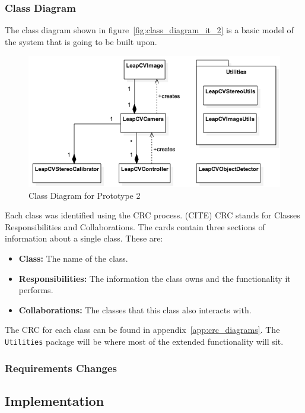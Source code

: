 \documentclass[11pt,oneside]{report}
\newcommand\code[1]{\texttt{#1}}
\begin{document}
		\subsubsection{Class Diagram}
		The class diagram shown in figure~\ref{fig:class_diagram_it_2} is a basic model of the system that is going to be built upon.
		\begin{figure}[ht]
		\begin{center}
    			\includegraphics[scale=0.65]{class_diagram_it_2}
    			\caption{Class Diagram for Prototype 2 \protect {\label{fig:class_diagram_it_2}}}
    		\end{center}
		\end{figure}			
		Each class was identified using the CRC process. (CITE)
		CRC stands for Classes Responsibilities and Collaborations.
		The cards contain three sections of information about a single class.
		These are:
		\begin{itemize}
			\item \textbf{Class:} The name of the class.
			\item \textbf{Responsibilities:} The information the class owns and the functionality it performs.
			\item \textbf{Collaborations:} The classes that this class also interacts with.
		\end{itemize}
		
		The CRC for each class can be found in appendix~\ref{app:crc_diagrams}.
		The \code{Utilities} package will be where most of the extended functionality will sit.
		\subsubsection{Requirements Changes}
				
		\subsection{Implementation}
\end{document}
